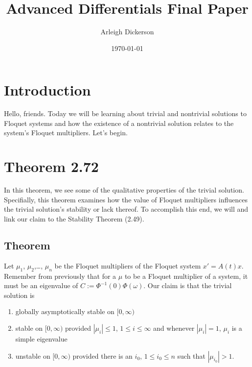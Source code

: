 \documentclass[a4paper]{article}
\title{Advanced Differentials Final Paper}
\author{Arleigh Dickerson}
\date{\today}
\begin{document}
\maketitle

\section{Introduction}
Hello, friends. Today we will be learning about trivial and nontrivial solutions to Floquet systems and how the existence of a nontrivial solution relates to the system's Floquet multipliers. Let's begin.
\section{Theorem 2.72}

In this theorem, we see some of the qualitative properties of the trivial solution. Specifially, this theorem examines how the value of Floquet multipliers influences the trivial solution's stability or lack thereof. To accomplish this end, we will and link our claim to the Stability Theorem (2.49).

\subsection{Theorem}

Let $\mu_1$, $\mu_2$,\ldots, $\mu_n$ be the Floquet multipliers of the Floquet system $x' = A(t)x$. Remember from previously that for a $\mu$ to be a Floquet multiplier of a system, it must be an eigenvalue of $C := \Phi^{-1}(0)\Phi(\omega)$. Our claim is that the trivial solution is \begin{enumerate}
    \item globally asymptotically stable on $[0,\infty)$
    \item stable on $[0,\infty)$ provided $|\mu_i| \leq 1$, $1 \leq i \leq \infty$ and whenever $|\mu_i| = 1$, $\mu_i$ is a simple eigenvalue
    \item unstable on $[0,\infty)$ provided there is an $i_0$, $1 \leq i_0 \leq n$ such that $|\mu_{i_0}| > 1$.
\end{enumerate}
\end{document}
